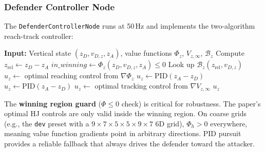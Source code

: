 \documentclass[11pt,a4paper]{article}
\begin{document}
\subsubsection{Defender Controller Node}

The \texttt{DefenderControllerNode} runs at 50\,Hz and implements the two-algorithm reach-track controller:

\begin{algorithm}[H]
\caption{Vertical Reach-Track (Algorithm 1) --- with winning region guard}
\begin{algorithmic}[1]
\State \textbf{Input:} Vertical state $(z_D, v_{D,z}, z_A)$, value functions $\Phi_z$, $V_{z,\infty}$, $\mathcal{B}_z$
\State Compute $z_\text{rel} \gets z_D - z_A$
\State $\textit{in\_winning} \gets \Phi_z(z_D, v_{D,z}, z_A) \leq 0$ 
\State Look up $\mathcal{B}_z(z_\text{rel}, v_{D,z})$
        \State $u_z \gets$ optimal reaching control from $\nabla\Phi_z$ 
    \Else
        \State $u_z \gets \text{PID}(z_A - z_D)$ 
    \EndIf
{}
    \State $u_z \gets \text{PID}(z_A - z_D)$ 
\Else
    \State $u_z \gets$ optimal tracking control from $\nabla V_{z,\infty}$ 
\EndIf
\State \Return $u_z$
\end{algorithmic}
\end{algorithm}

\begin{infobox}
The \textbf{winning region guard} ($\Phi \leq 0$ check) is critical for robustness. The paper's optimal HJ controls are only valid inside the winning region. On coarse grids (e.g., the \texttt{dev} preset with a $9 \times 7 \times 5 \times 5 \times 9 \times 7$ 6D grid), $\Phi_h > 0$ everywhere, meaning value function gradients point in arbitrary directions. PID pursuit provides a reliable fallback that always drives the defender toward the attacker.
\end{infobox}
\end{document}
